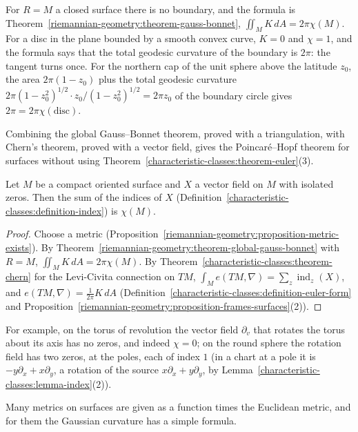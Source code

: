 For $R = M$ a closed surface there is no boundary, and the formula is Theorem~\ref{riemannian-geometry:theorem-gauss-bonnet}, $\iint_MK\,dA = 2\pi\chi(M)$. For a disc in the
plane bounded by a smooth convex curve, $K = 0$ and $\chi = 1$, and the formula says that the total geodesic curvature of the boundary is $2\pi$: the tangent turns once. For the
northern cap of the unit sphere above the latitude $z_0$, the area $2\pi(1 - z_0)$ plus the total geodesic curvature $2\pi(1 - z_0^2)^{1/2} \cdot z_0/(1 - z_0^2)^{1/2} = 2\pi z_0$ of
the boundary circle gives $2\pi = 2\pi\chi(\text{disc})$.

Combining the global Gauss--Bonnet theorem, proved with a triangulation, with Chern's theorem, proved with a vector field, gives the Poincar\'e--Hopf theorem for surfaces without
using Theorem~\ref{characteristic-classes:theorem-euler}(3).

\begin{corollary}\label{riemannian-geometry:corollary-poincare-hopf-surfaces}
Let $M$ be a compact oriented surface and $X$ a vector field on $M$ with isolated zeros. Then the sum of the indices of $X$ (Definition~\ref{characteristic-classes:definition-index}) is $\chi(M)$.
\end{corollary}

\begin{proof}
Choose a metric (Proposition~\ref{riemannian-geometry:proposition-metric-exists}). By Theorem~\ref{riemannian-geometry:theorem-global-gauss-bonnet} with $R = M$, $\iint_MK\,dA = 2\pi\chi(M)$. By
Theorem~\ref{characteristic-classes:theorem-chern} for the Levi-Civita connection on $TM$, $\int_Me(TM, \nabla) = \sum_z\operatorname{ind}_z(X)$, and $e(TM, \nabla) = \frac{1}{2\pi}K\,dA$
(Definition~\ref{characteristic-classes:definition-euler-form} and Proposition~\ref{riemannian-geometry:proposition-frames-surfaces}(2)).
\end{proof}

For example, on the torus of revolution the vector field $\partial_v$ that rotates the torus about its axis has no zeros, and indeed $\chi = 0$; on the round sphere the rotation field has two
zeros, at the poles, each of index $1$ (in a chart at a pole it is $-y\partial_x + x\partial_y$, a rotation of the source $x\partial_x + y\partial_y$, by
Lemma~\ref{characteristic-classes:lemma-index}(2)).

Many metrics on surfaces are given as a function times the Euclidean metric, and for them the Gaussian curvature has a simple formula.

